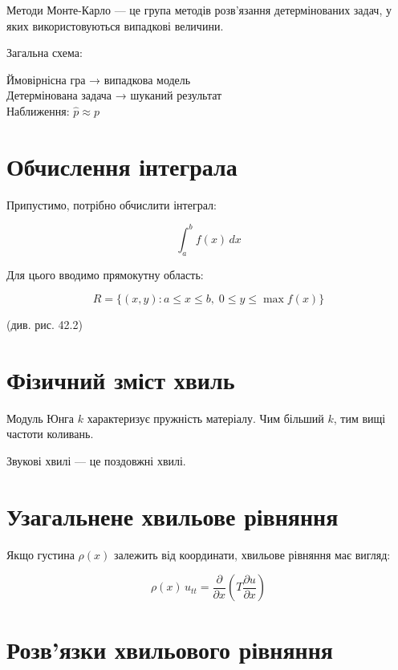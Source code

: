 \documentclass[
  ukrainian,
]{article}
\begin{document}
Методи Монте-Карло --- це група методів розв'язання детермінованих
задач, у яких використовуються випадкові величини.

Загальна схема:

Ймовірнісна гра → випадкова модель\\
Детермінована задача → шуканий результат\\
Наближення: \(\hat{p} \approx p\)

\section{Обчислення
інтеграла}\label{ux43eux431ux447ux438ux441ux43bux435ux43dux43dux44f-ux456ux43dux442ux435ux433ux440ux430ux43bux430}

Припустимо, потрібно обчислити інтеграл:

\[
\int_a^b f(x)\,dx
\]

Для цього вводимо прямокутну область:

\[
R = \{(x,y): a \le x \le b,\; 0 \le y \le \max f(x)\}
\]

(див. рис. 42.2)

\section{Фізичний зміст
хвиль}\label{ux444ux456ux437ux438ux447ux43dux438ux439-ux437ux43cux456ux441ux442-ux445ux432ux438ux43bux44c}

Модуль Юнга \(k\) характеризує пружність матеріалу. Чим більший \(k\),
тим вищі частоти коливань.

Звукові хвилі --- це поздовжні хвилі.

\section{Узагальнене хвильове
рівняння}\label{ux443ux437ux430ux433ux430ux43bux44cux43dux435ux43dux435-ux445ux432ux438ux43bux44cux43eux432ux435-ux440ux456ux432ux43dux44fux43dux43dux44f}

Якщо густина \(\rho(x)\) залежить від координати, хвильове рівняння має
вигляд:

\[
\rho(x)\,u_{tt} = \frac{\partial}{\partial x}\left( T \frac{\partial u}{\partial x} \right)
\]

\section{Розв'язки хвильового
рівняння}\label{ux440ux43eux437ux432ux44fux437ux43aux438-ux445ux432ux438ux43bux44cux43eux432ux43eux433ux43e-ux440ux456ux432ux43dux44fux43dux43dux44f}
\end{document}
